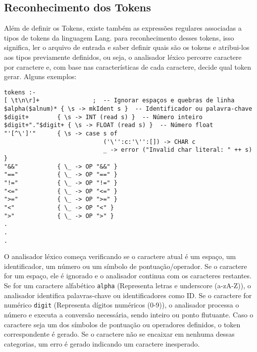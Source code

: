 \documentclass{article}
\begin{document}
\subsection{Reconhecimento dos Tokens}

Além de definir os Tokens, existe também as expressões regulares associadas a tipos de tokens da linguagem Lang. para reconhecimento desses tokens, isso significa, ler o arquivo de entrada e saber definir quais são os tokens e atribui-los aos tipos previamente definidos, ou seja, o analisador léxico percorre caractere por caractere e, com base nas características de cada caractere, decide qual token gerar. Alguns exemplos:

\begin{verbatim}
tokens :-
[ \t\n\r]+               ;  -- Ignorar espaços e quebras de linha
$alpha($alnum)* { \s -> mkIdent s }  -- Identificador ou palavra-chave
$digit+        { \s -> INT (read s) }  -- Número inteiro
$digit+"."$digit+ { \s -> FLOAT (read s) }  -- Número float
"'[^\']'"      { \s -> case s of
                            ('\'':c:'\'':[]) -> CHAR c
                            _ -> error ("Invalid char literal: " ++ s) }
"&&"           { \_ -> OP "&&" }
"=="           { \_ -> OP "==" }
"!="           { \_ -> OP "!=" }
"<="           { \_ -> OP "<=" }
">="           { \_ -> OP ">=" }
"<"            { \_ -> OP "<" }
">"            { \_ -> OP ">" }
.
.
.
\end{verbatim}

O analisador léxico começa verificando se o caractere atual é um espaço, um identificador, um número ou um símbolo de pontuação/operador. Se o caractere for um espaço, ele é ignorado e o analisador continua com os caracteres restantes. Se for um caractere alfabético \texttt{alpha} (Representa letras e underscore (a-zA-Z)), o analisador identifica palavras-chave ou identificadores como ID. Se o caractere for numérico \texttt{digit} (Representa dígitos numéricos (0-9)), o analisador processa o número e executa a conversão necessária, sendo inteiro ou ponto flutuante. Caso o caractere seja um dos símbolos de pontuação ou operadores definidos, o token correspondente é gerado. Se o caractere não se encaixar em nenhuma dessas categorias, um erro é gerado indicando um caractere inesperado.

\newpage
\end{document}
